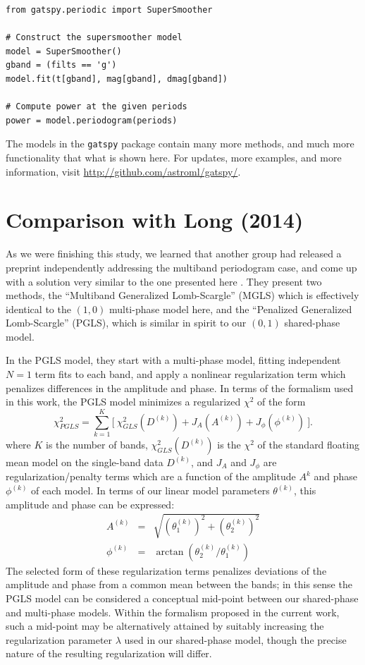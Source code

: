 \documentclass{emulateapj}
\newcommand{\sectlabel}[1]{\label{sect:#1}}
\begin{document}
\begin{lstlisting}
from gatspy.periodic import SuperSmoother

# Construct the supersmoother model
model = SuperSmoother()
gband = (filts == 'g')
model.fit(t[gband], mag[gband], dmag[gband])

# Compute power at the given periods
power = model.periodogram(periods)
\end{lstlisting}

The models in the \texttt{gatspy} package contain many more methods, and much more functionality that what is shown here. For updates, more examples, and more information, visit \url{http://github.com/astroml/gatspy/}.


\section{Comparison with Long (2014)}
\sectlabel{long_comparison}
As we were finishing this study, we learned that another group had released a preprint independently addressing the multiband periodogram case, and come up with a solution very similar to the one presented here \citep[][hereafter LCB14]{Long2014}.
They present two methods, the ``Multiband Generalized Lomb-Scargle'' (MGLS) which is effectively identical to the $(1, 0)$ multi-phase model
here, and the ``Penalized Generalized Lomb-Scargle'' (PGLS), which is similar in spirit to our $(0, 1)$ shared-phase model.

In the PGLS model, they start with a multi-phase model, fitting independent $N=1$ term fits to each band, and apply a nonlinear regularization term which penalizes differences in the amplitude and phase. In terms of the formalism used in this work, the PGLS model minimizes a regularized $\chi^2$ of the form
\begin{equation}
  \chi^2_{PGLS} = \sum_{k=1}^K \bigg[~\chi^2_{GLS}(D^{(k)}) + J_A(A^{(k)}) + J_\phi(\phi^{(k)})~\bigg].
\end{equation}
where $K$ is the number of bands, $\chi^2_{GLS}(D^{(k)})$ is the $\chi^2$ of the standard floating mean model on the single-band data $D^{(k)}$, and $J_A$ and $J_\phi$ are regularization/penalty terms which are a function of the amplitude $A^{k}$ and phase $\phi^{(k)}$ of each model. In terms of our linear model parameters $\theta^{(k)}$, this amplitude and phase can be expressed:
\begin{eqnarray}
 A^{(k)} &=& \sqrt{(\theta_1^{(k)})^2 + (\theta_2^{(k)})^2}\nonumber\\
 \phi^{(k)} &=& \arctan(\theta_2^{(k)} / \theta_1^{(k)})
\end{eqnarray}
The selected form of these regularization terms penalizes deviations of the amplitude and phase from a common mean between the bands; in this sense the PGLS model can be considered a conceptual mid-point between our shared-phase and multi-phase models.
Within the formalism proposed in the current work, such a mid-point may be alternatively attained by suitably increasing the regularization parameter $\lambda$ used in our shared-phase model, though the precise nature of the resulting regularization will differ.
\end{document}
